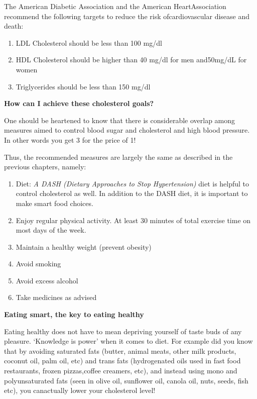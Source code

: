 
The American Diabetic Association and the American Heart\break Association recommend the following targets to reduce the risk of\break cardiovascular disease and death:

\begin{enumerate}[•]
\itemsep=0pt
\item LDL Cholesterol should be less than 100 mg/dl
\item HDL Cholesterol should be higher than 40 mg/dl for men and\break 50mg/dL for women
\item Triglycerides should be less than 150 mg/dl
\end{enumerate}

\noindent\textbf{How can I achieve these cholesterol goals?}

One should be heartened to know that there is considerable overlap among measures aimed to control blood sugar and cholesterol and high blood pressure. In other words you get 3 for the price of 1!

Thus, the recommended measures are largely the same as described in the previous chapters, namely:

\begin{enumerate}
\itemsep=0pt
\item Diet: \textit{A DASH (Dietary Approaches to Stop Hypertension)} diet is helpful to control cholesterol as well. In addition to the DASH diet, it is important to make smart food choices.
\item Enjoy regular physical activity. At least 30 minutes of total exercise time on most days of the week.
\item Maintain a healthy weight (prevent obesity)
\item Avoid smoking
\item Avoid excess alcohol
\item Take medicines as advised
\end{enumerate}

\noindent\textbf{Eating smart, the key to eating healthy}

Eating healthy does not have to mean depriving yourself of taste buds of any pleasure. ‘Knowledge is power’ when it comes to diet. For example did you know that by avoiding saturated fats (butter, animal meats, other milk products, coconut oil, palm oil, etc) and trans fats (hydrogenated oils used in fast food restaurants, frozen pizzas,\break coffee creamers, etc), and instead using mono and polyunsaturated fats (seen in olive oil, sunflower oil, canola oil, nuts, seeds, fish etc), you can\break actually lower your cholesterol level!

